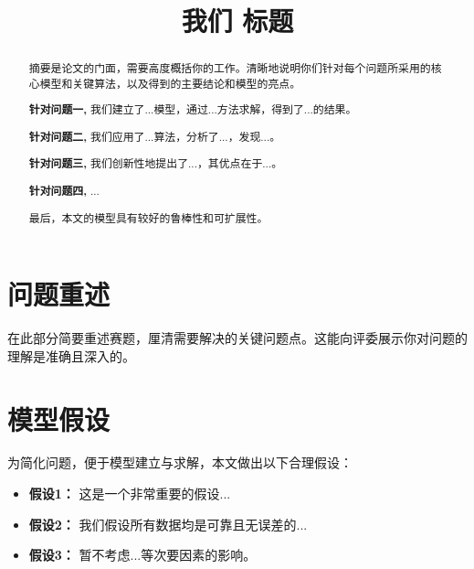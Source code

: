 \documentclass[withoutpreface,notoc]{cumcmthesis}
\title{我们 标题} %
\begin{document}
	\maketitle
	\begin{abstract}
		摘要是论文的门面，需要高度概括你的工作。清晰地说明你们针对每个问题所采用的核心模型和关键算法，以及得到的主要结论和模型的亮点。
		
		\textbf{针对问题一,} 我们建立了...模型，通过...方法求解，得到了...的结果。
		
		\textbf{针对问题二,} 我们应用了...算法，分析了...，发现...。
		
		\textbf{针对问题三,} 我们创新性地提出了...，其优点在于...。
		
		\textbf{针对问题四,} ...
		
		最后，本文的模型具有较好的鲁棒性和可扩展性。
		
	\end{abstract}
	
	
	\section{问题重述}
	在此部分简要重述赛题，厘清需要解决的关键问题点。这能向评委展示你对问题的理解是准确且深入的。
	
	\section{模型假设}
	为简化问题，便于模型建立与求解，本文做出以下合理假设：
	\begin{itemize}[itemindent=2em]
		\item \textbf{假设1：} 这是一个非常重要的假设...
		\item \textbf{假设2：} 我们假设所有数据均是可靠且无误差的...
		\item \textbf{假设3：} 暂不考虑...等次要因素的影响。
	\end{itemize}
	
\end{document}
